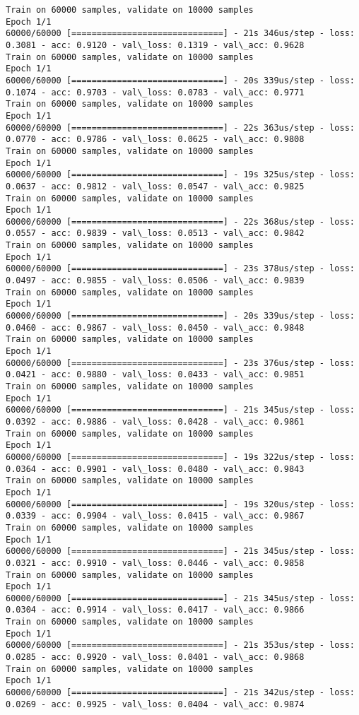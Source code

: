 \documentclass[11pt]{article}
\begin{document}
    \begin{Verbatim}[commandchars=\\\{\}]
Train on 60000 samples, validate on 10000 samples
Epoch 1/1
60000/60000 [==============================] - 21s 346us/step - loss: 0.3081 - acc: 0.9120 - val\_loss: 0.1319 - val\_acc: 0.9628
Train on 60000 samples, validate on 10000 samples
Epoch 1/1
60000/60000 [==============================] - 20s 339us/step - loss: 0.1074 - acc: 0.9703 - val\_loss: 0.0783 - val\_acc: 0.9771
Train on 60000 samples, validate on 10000 samples
Epoch 1/1
60000/60000 [==============================] - 22s 363us/step - loss: 0.0770 - acc: 0.9786 - val\_loss: 0.0625 - val\_acc: 0.9808
Train on 60000 samples, validate on 10000 samples
Epoch 1/1
60000/60000 [==============================] - 19s 325us/step - loss: 0.0637 - acc: 0.9812 - val\_loss: 0.0547 - val\_acc: 0.9825
Train on 60000 samples, validate on 10000 samples
Epoch 1/1
60000/60000 [==============================] - 22s 368us/step - loss: 0.0557 - acc: 0.9839 - val\_loss: 0.0513 - val\_acc: 0.9842
Train on 60000 samples, validate on 10000 samples
Epoch 1/1
60000/60000 [==============================] - 23s 378us/step - loss: 0.0497 - acc: 0.9855 - val\_loss: 0.0506 - val\_acc: 0.9839
Train on 60000 samples, validate on 10000 samples
Epoch 1/1
60000/60000 [==============================] - 20s 339us/step - loss: 0.0460 - acc: 0.9867 - val\_loss: 0.0450 - val\_acc: 0.9848
Train on 60000 samples, validate on 10000 samples
Epoch 1/1
60000/60000 [==============================] - 23s 376us/step - loss: 0.0421 - acc: 0.9880 - val\_loss: 0.0433 - val\_acc: 0.9851
Train on 60000 samples, validate on 10000 samples
Epoch 1/1
60000/60000 [==============================] - 21s 345us/step - loss: 0.0392 - acc: 0.9886 - val\_loss: 0.0428 - val\_acc: 0.9861
Train on 60000 samples, validate on 10000 samples
Epoch 1/1
60000/60000 [==============================] - 19s 322us/step - loss: 0.0364 - acc: 0.9901 - val\_loss: 0.0480 - val\_acc: 0.9843
Train on 60000 samples, validate on 10000 samples
Epoch 1/1
60000/60000 [==============================] - 19s 320us/step - loss: 0.0339 - acc: 0.9904 - val\_loss: 0.0415 - val\_acc: 0.9867
Train on 60000 samples, validate on 10000 samples
Epoch 1/1
60000/60000 [==============================] - 21s 345us/step - loss: 0.0321 - acc: 0.9910 - val\_loss: 0.0446 - val\_acc: 0.9858
Train on 60000 samples, validate on 10000 samples
Epoch 1/1
60000/60000 [==============================] - 21s 345us/step - loss: 0.0304 - acc: 0.9914 - val\_loss: 0.0417 - val\_acc: 0.9866
Train on 60000 samples, validate on 10000 samples
Epoch 1/1
60000/60000 [==============================] - 21s 353us/step - loss: 0.0285 - acc: 0.9920 - val\_loss: 0.0401 - val\_acc: 0.9868
Train on 60000 samples, validate on 10000 samples
Epoch 1/1
60000/60000 [==============================] - 21s 342us/step - loss: 0.0269 - acc: 0.9925 - val\_loss: 0.0404 - val\_acc: 0.9874

    \end{Verbatim}
\end{document}
